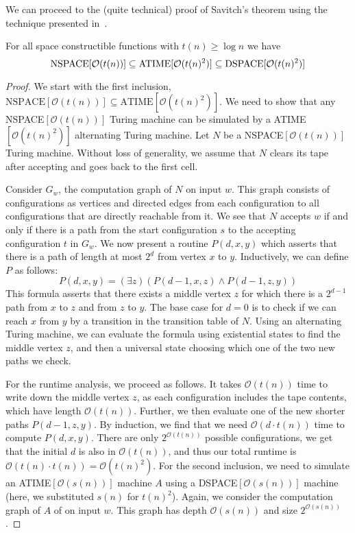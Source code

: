 We can proceed to the (quite technical) proof of Savitch's theorem using the technique presented in~\cite{descriptive-complexity}.
\begin{theorem}
    For all space constructible functions with $t(n) \geq \log n$ we have
    \[
        \text{\upshape NSPACE}[\mathcal{O}(t(n))] \subseteq \text{\upshape ATIME}[\mathcal{O}(t(n)^2)] \subseteq \text{\upshape DSPACE}[\mathcal{O}(t(n)^2)]
    \]
\end{theorem}

\begin{proof}
    We start with the first inclusion, $\text{NSPACE$[\mathcal{O}(t(n))]$} \subseteq \text{ATIME$[\mathcal{O}(t(n)^2)]$}$.
    We need to show that any NSPACE$[\mathcal{O}(t(n))]$ Turing machine can be simulated by a ATIME$[\mathcal{O}(t(n)^2)]$ alternating Turing machine.
    Let $N$ be a NSPACE$[\mathcal{O}(t(n))]$ Turing machine.
    Without loss of generality, we assume that $N$ clears its tape after accepting and goes back to the first cell.

    Consider $G_w$, the computation graph of $N$ on input $w$.
    This graph consists of configurations as vertices and directed edges from each configuration to all configurations that are directly reachable from it.
    We see that $N$ accepts $w$ if and only if there is a path from the start configuration $s$ to the accepting configuration $t$ in $G_w$.
    We now present a routine $P(d, x, y)$ which asserts that there is a path of length at most $2^{d}$ from vertex $x$ to $y$.
    Inductively, we can define $P$ as follows:
    \[
        P(d, x, y) = (\exists z)(P(d - 1, x, z) \land P(d - 1, z, y))
    \]
    This formula asserts that there exists a middle vertex $z$ for which there is a $2^{d - 1}$ path from $x$ to $z$ and from $z$ to $y$.
    The base case for $d = 0$ is to check if we can reach $x$ from $y$ by a transition in the transition table of $N$.
    Using an alternating Turing machine, we can evaluate the formula using existential states to find the middle vertex $z$, and then a universal state choosing which one of the two new paths we check.

    For the runtime analysis, we proceed as follows.
    It takes $\mathcal{O}(t(n))$ time to write down the middle vertex $z$, as each configuration includes the tape contents, which have length $\mathcal{O}(t(n))$.
    Further, we then evaluate one of the new shorter paths $P(d - 1, z, y)$.
    By induction, we find that we need $\mathcal{O}(d\cdot t(n))$ time to compute $P(d, x, y)$.
    There are only $2^{\mathcal{O}(t(n))}$ possible configurations, we get that the initial $d$ is also in $\mathcal{O}(t(n))$, and thus our total runtime is $\mathcal{O}(t(n)\cdot t(n)) = \mathcal{O}(t(n)^2)$.
    \vspace{5mm}
    \sloppy For the second inclusion, we need to simulate an ATIME$[\mathcal{O}(s(n))]$ machine $A$ using a DSPACE$[\mathcal{O}(s(n))]$ machine (here, we substituted $s(n)$ for $t(n)^2$).
    Again, we consider the computation graph of $A$ of on input $w$.
    This graph has depth $\mathcal{O}(s(n))$ and size $2^{\mathcal{O}(s(n))}$.


\end{proof}
